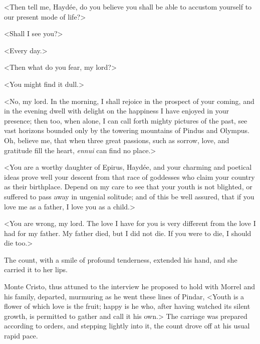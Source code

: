  <Then tell me, Haydée, do you believe you shall be able to accustom yourself to our present mode of life?> 

 <Shall I see you?> 

 <Every day.> 

 <Then what do you fear, my lord?> 

 <You might find it dull.> 

 <No, my lord. In the morning, I shall rejoice in the prospect of your coming, and in the evening dwell with delight on the happiness I have enjoyed in your presence; then too, when alone, I can call forth mighty pictures of the past, see vast horizons bounded only by the towering mountains of Pindus and Olympus. Oh, believe me, that when three great passions, such as sorrow, love, and gratitude fill the heart, \textit{ennui} can find no place.> 

 <You are a worthy daughter of Epirus, Haydée, and your charming and poetical ideas prove well your descent from that race of goddesses who claim your country as their birthplace. Depend on my care to see that your youth is not blighted, or suffered to pass away in ungenial solitude; and of this be well assured, that if you love me as a father, I love you as a child.> 

 <You are wrong, my lord. The love I have for you is very different from the love I had for my father. My father died, but I did not die. If you were to die, I should die too.> 

 The count, with a smile of profound tenderness, extended his hand, and she carried it to her lips. 

 Monte Cristo, thus attuned to the interview he proposed to hold with Morrel and his family, departed, murmuring as he went these lines of Pindar, <Youth is a flower of which love is the fruit; happy is he who, after having watched its silent growth, is permitted to gather and call it his own.> The carriage was prepared according to orders, and stepping lightly into it, the count drove off at his usual rapid pace. 